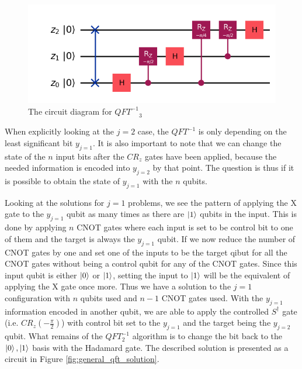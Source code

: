 \documentclass[12pt,a4paper]{article}
\begin{document}
\begin{figure}[htbp] 
    \centering \includegraphics[width=1\textwidth]{Figures/inverse_qft_3.png} 
    \caption{The circuit diagram for ${QFT^{-1}}_3$} 
    \label{fig:inv_qft_3} 
\end{figure}

When explicitly looking at the \(j=2\) case, the \(QFT^{-1}\) is only depending on the least significant bit \(y_{j=1}\). It is also important to note that we can change the state of the \(n\) input bits after the \(CR_z\) gates have been applied, because the needed information is encoded into \(y_{j=2}\) by that point. The question is thus if it is possible to obtain the state of \(y_{j=1}\) with the \(n\) qubits. 

Looking at the solutions for \(j=1\) problems, we see the pattern of applying the X gate to the \(y_{j=1}\) qubit as many times as there are \(\ket{1}\) qubits in the input. This is done by applying \(n\) CNOT gates where each input is set to be control bit to one of them and the target is always the \(y_{j=1}\) qubit. If we now reduce the number of CNOT gates by one and set one of the inputs to be the target qibut for all the CNOT gates without being a control qubit for any of the CNOT gates. Since this input qubit is either \(\ket{0}\) or \(\ket{1}\), setting the input to \(\ket{1}\) will be the equivalent of applying the X gate once more. Thus we have a solution to the \(j=1\) configuration with \(n\) qubits used and \(n-1\) CNOT gates used. With the \(y_{j=1}\) information encoded in another qubit, we are able to apply the controlled \(S^{\dagger}\) gate (i.e. \(CR_z(-\frac{\pi}{2})\)) with control bit set to the \(y_{j=1}\) and the target being the \(y_{j=2}\) qubit. What remains of the \(QFT^{-1}_{2}\) algorithm is to change the bit back to the \(\ket{0}, \ket{1}\) basis with the Hadamard gate. The described solution is presented as a circuit in Figure \ref{fig:general_qft_solution}.
\end{document}
